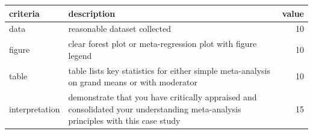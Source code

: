 \documentclass[
]{book}
\begin{document}
\begin{tabular}{llr}
\toprule
criteria & description & value\\
\midrule
data & reasonable dataset collected & 10\\
figure & clear forest plot or meta-regression plot with figure legend & 10\\
table & table lists key statistics for either simple meta-analysis on grand means or with moderator & 10\\
interpretation & demonstrate that you have critically appraised and consolidated your understanding meta-analysis principles with this case study & 15\\
\bottomrule
\end{tabular}

  
\end{document}
